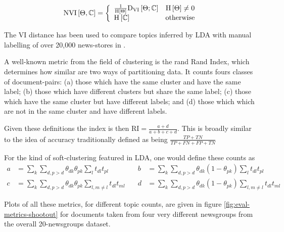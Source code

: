 \begin{align}
\text{NVI}\left[ \Theta, \mathbb{C} \right] = \left\{ \begin{array}{lr}
     \frac{1}{\text{H} \left[ \Theta \right]}\text{D}_\text{VI} \left[ \Theta; \mathbb{C} \right] & \text{H} \left[ \Theta \right] \neq 0 \\
     \text{H} \left[ \mathbb{C} \right] & \text{otherwise}
 \end{array}\right.
\end{align}


The VI distance has been used to compare topics inferred by LDA with manual labelling of over 20,000 news-stores in \cite{HeinrichEtAl2005}. 


A well-known metric from the field of clustering is the rand Rand Index, which determines how similar are two ways of partitioning data. It counts fours classes of document-pairs: (a) those which have the same cluster and have the same label; (b) those which have different clusters but share the same label; (c) those which have the same cluster but have different labels; and (d) those which which are not in the same cluster and have different labels.

Given these definitions the index is then $\text{RI} = \frac{a + d}{a + b + c + d}$. This is broadly similar to the idea of accuracy traditionally defined as being $\frac{TP + TN}{TP + FN + FP + TN}$

For the kind of soft-clustering featured in LDA, one would define these counts as
\begin{align}
a & = \sum_k \sum_{d, {p>d}} \theta_{dk} \theta_{pk} \sum_l t_{dl}t_{pl} & \quad
b & = \sum_k \sum_{d, {p>d}} \theta_{dk} (1 -\theta_{pk}) \sum_l t_{dl}t_{pl}\\
c & = \sum_k \sum_{d, {p>d}} \theta_{dk} \theta_{pk} \sum_{l,m \neq l} t_{dl}t_{ml} & \quad
d & = \sum_k \sum_{d, {p>d}} \theta_{dk} (1- \theta_{pk}) \sum_{l,m \neq l} t_{dl}t_{ml}
\end{align}

Plots of all these metrics, for different topic counts, are given in figure \ref{fig:eval-metrics-shootout} for documents taken from four very different newsgroups from the overall 20-newsgroups dataset.




